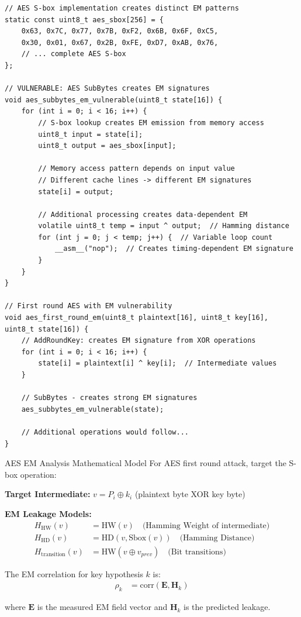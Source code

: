 \documentclass[11pt,a4paper]{article}
\theoremstyle{definition}
\begin{document}
\begin{lstlisting}[caption={AES Implementation with EM Signatures}]
// AES S-box implementation creates distinct EM patterns
static const uint8_t aes_sbox[256] = {
    0x63, 0x7C, 0x77, 0x7B, 0xF2, 0x6B, 0x6F, 0xC5,
    0x30, 0x01, 0x67, 0x2B, 0xFE, 0xD7, 0xAB, 0x76,
    // ... complete AES S-box
};

// VULNERABLE: AES SubBytes creates EM signatures
void aes_subbytes_em_vulnerable(uint8_t state[16]) {
    for (int i = 0; i < 16; i++) {
        // S-box lookup creates EM emission from memory access
        uint8_t input = state[i];
        uint8_t output = aes_sbox[input];
        
        // Memory access pattern depends on input value
        // Different cache lines -> different EM signatures
        state[i] = output;
        
        // Additional processing creates data-dependent EM
        volatile uint8_t temp = input ^ output;  // Hamming distance
        for (int j = 0; j < temp; j++) {  // Variable loop count
            __asm__("nop");  // Creates timing-dependent EM signature
        }
    }
}

// First round AES with EM vulnerability
void aes_first_round_em(uint8_t plaintext[16], uint8_t key[16], uint8_t state[16]) {
    // AddRoundKey: creates EM signature from XOR operations
    for (int i = 0; i < 16; i++) {
        state[i] = plaintext[i] ^ key[i];  // Intermediate values
    }
    
    // SubBytes - creates strong EM signatures
    aes_subbytes_em_vulnerable(state);
    
    // Additional operations would follow...
}
\end{lstlisting}

\begin{mathematicsbox}{AES EM Analysis Mathematical Model}
For AES first round attack, target the S-box operation:

\textbf{Target Intermediate:} $v = P_i \oplus k_i$ (plaintext byte XOR key byte)

\textbf{EM Leakage Models:}
\begin{align}
H_{\text{HW}}(v) &= \text{HW}(v) \quad \text{(Hamming Weight of intermediate)} \\
H_{\text{HD}}(v) &= \text{HD}(v, \text{Sbox}(v)) \quad \text{(Hamming Distance)} \\
H_{\text{transition}}(v) &= \text{HW}(v \oplus v_{prev}) \quad \text{(Bit transitions)}
\end{align}

The EM correlation for key hypothesis $k$ is:
\begin{align}
\rho_k &= \text{corr}(\mathbf{E}, \mathbf{H}_k)
\end{align}

where $\mathbf{E}$ is the measured EM field vector and $\mathbf{H}_k$ is the predicted leakage.
\end{mathematicsbox}
\end{document}

